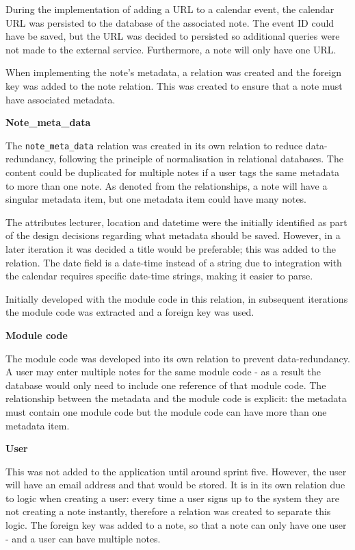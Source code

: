 During the implementation of adding a URL to a calendar event, the calendar URL was persisted to the database of the associated note. The event ID could have be saved, but the URL was decided to persisted so additional queries were not made to the external service. Furthermore, a note will only have one URL.

When implementing the note's metadata, a relation was created and the foreign key was added to the note relation. This was created to ensure that a note must have associated metadata.

\noindent
\textbf{Note\_meta\_data}

The \texttt{note\_meta\_data} relation was created in its own relation to reduce data-redundancy, following the principle of normalisation in relational databases. The content could be duplicated for multiple notes if a user tags the same metadata to more than one note. As denoted from the relationships, a note will have a singular metadata item, but one metadata item could have many notes.

The attributes lecturer, location and datetime were the initially identified as part of the design decisions regarding what metadata should be saved. However, in a later iteration it was decided a title would be preferable; this was added to the relation. The date field is a date-time instead of a string due to integration with the calendar requires specific date-time strings, making it easier to parse.

Initially developed with the module code in this relation, in subsequent iterations the module code was extracted and a foreign key was used.

\noindent
\textbf{Module code}

The module code was developed into its own relation to prevent data-redundancy. A user may enter multiple notes for the same module code - as a result the database would only need to include one reference of that module code. The relationship between the metadata and the module code is explicit: the metadata must contain one module code but the module code can have more than one metadata item.

\noindent
\textbf{User}

This was not added to the application until around sprint five. However, the user will have an email address and that would be stored. It is in its own relation due to logic when creating a user: every time a user signs up to the system they are not creating a note instantly, therefore a relation was created to separate this logic. The foreign key was added to a note, so that a note can only have one user - and a user can have multiple notes.


